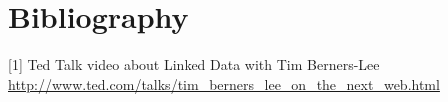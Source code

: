 \chapter*{Bibliography}

[1] Ted Talk video about Linked Data with Tim Berners-Lee \url{http://www.ted.com/talks/tim_berners_lee_on_the_next_web.html}